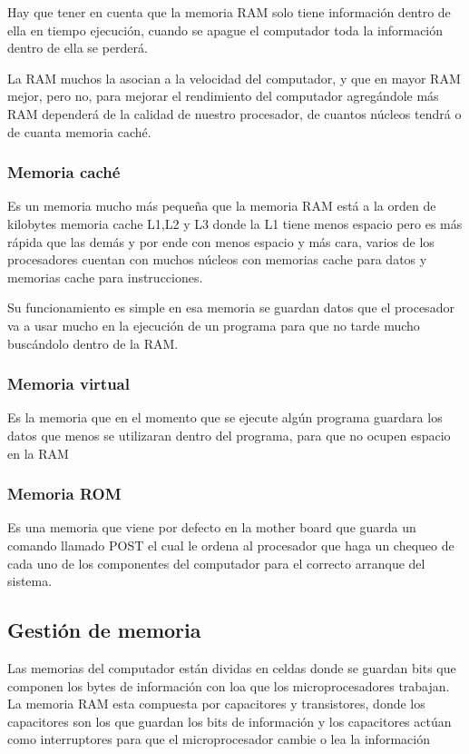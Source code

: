 \documentclass{article}
\begin{document}
Hay que tener en cuenta que la memoria RAM solo tiene información dentro de ella en tiempo ejecución, cuando se apague el computador toda la información dentro de ella se perderá.

La RAM muchos la asocian a la velocidad del computador, y que en mayor RAM mejor, pero no, para mejorar el rendimiento del computador agregándole más RAM dependerá de la calidad de nuestro procesador, de cuantos núcleos tendrá o de cuanta memoria caché.

\subsubsection{Memoria caché}

Es un memoria mucho más pequeña que la memoria RAM está a la orden de kilobytes memoria cache L1,L2 y L3 donde la L1 tiene menos espacio pero es más rápida que las demás y por ende con menos espacio y más cara, varios de los procesadores cuentan con muchos núcleos con memorias cache para datos y memorias cache para instrucciones.

\vspace{10pt}

Su funcionamiento es simple en esa memoria se guardan datos que el procesador va a usar mucho en la ejecución de un programa para que no tarde mucho buscándolo dentro de la RAM.
\subsubsection{Memoria virtual}

Es la memoria que en el momento que se ejecute algún programa guardara los datos que menos se utilizaran dentro del programa, para que no ocupen espacio en la RAM

\subsubsection{Memoria ROM}
Es una memoria  que viene por defecto en la mother board que guarda un comando llamado POST el cual le ordena al procesador que haga un chequeo de cada uno de los componentes del computador para el correcto arranque del sistema.\cite{Augusto}
\subsection{Gestión de memoria}

Las memorias del computador están dividas en celdas donde se guardan bits que componen los bytes de información con loa que los microprocesadores trabajan.
	La memoria RAM esta compuesta por capacitores  y transistores, donde los capacitores son los que guardan los bits de información  y los capacitores actúan como interruptores para que el microprocesador cambie o lea la información 
\end{document}
